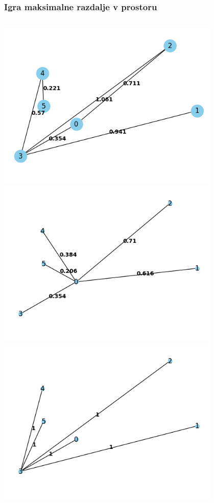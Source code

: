 \documentclass[12pt, hyperref={unicode}]{beamer}
\begin{document}

\begin{frame}
  
  \frametitle{Igra maksimalne razdalje v prostoru}
  \begin{columns}
    \includegraphics[width=0.8\textwidth]{imput_1.png}
    \includegraphics[width=0.8\textwidth]{output_3.png}
    \includegraphics[width=0.8\textwidth]{output_4.png}
  \end{columns}
  
\end{frame}

\end{document}
